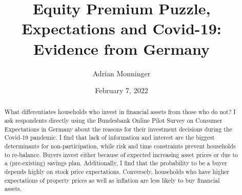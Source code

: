 \documentclass[ProjectABM]{subfiles}
\begin{document}
\providecommand{\versn}{pdf} %
\ifthenelse{\boolean{Web}}{    %
  \renewcommand{\versn}{Web}     %
  \renewcommand{\rootFromOut}{.} %
}{}  %


\title{Equity Premium Puzzle, Expectations and Covid-19:\\ Evidence from Germany}

\author{Adrian Monninger\authNum}




\renewcommand{\forcedate}{February 7, 2022}\date{\forcedate}

\maketitle
\hypertarget{abstract}{}
\begin{abstract}
	What differentiates households who invest in financial assets from those who do not? I ask respondents directly using the Bundesbank Online Pilot Survey on Consumer Expectations in Germany about the reasons for their investment decisions during the Covid-19 pandemic. I find that lack of information and interest are the biggest determinants for non-participation, while risk and time constraints prevent households to re-balance. Buyers invest either because of expected increasing asset prices or due to a (pre-existing) savings plan. Additionally, I find that the probability to be a buyer depends highly on stock price expectations. Conversely, households who have higher expectations of property prices as well as inflation are less likely to buy financial assets.
\end{abstract}
\end{document}
